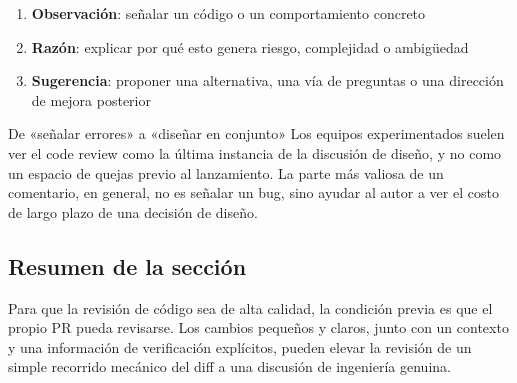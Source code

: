 \begin{enumerate}
    \item \textbf{Observación}: señalar un código o un comportamiento concreto
    \item \textbf{Razón}: explicar por qué esto genera riesgo, complejidad o ambigüedad
    \item \textbf{Sugerencia}: proponer una alternativa, una vía de preguntas o una dirección de mejora posterior
\end{enumerate}

\begin{knowledgebox}{De «señalar errores» a «diseñar en conjunto»}
Los equipos experimentados suelen ver el code review como la última instancia de la discusión de diseño, y no como un espacio de quejas previo al lanzamiento. La parte más valiosa de un comentario, en general, no es señalar un bug, sino ayudar al autor a ver el costo de largo plazo de una decisión de diseño.
\end{knowledgebox}

\subsection{Resumen de la sección}

Para que la revisión de código sea de alta calidad, la condición previa es que el propio PR pueda revisarse. Los cambios pequeños y claros, junto con un contexto y una información de verificación explícitos, pueden elevar la revisión de un simple recorrido mecánico del diff a una discusión de ingeniería genuina.
